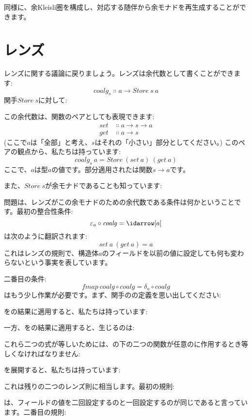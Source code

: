 同様に、余Kleisli圏を構成し、対応する随伴から余モナドを再生成することができます。

\section{レンズ}

レンズに関する議論に戻りましょう。レンズは余代数として書くことができます: 
\[\mathit{coalg}_s \Colon a \to \mathit{Store}\ s\ a\]
関手$\mathit{Store}\ s$に対して: 

この余代数は、関数のペアとしても表現できます: 
\begin{align*}
  \mathit{set} & \Colon a \to s \to a \\
  \mathit{get} & \Colon a \to s
\end{align*}
 (ここで$a$は「全部」と考え、$s$はそれの「小さい」部分としてください。) このペアの観点から、私たちは持っています: 
\[\mathit{coalg}_s\ a = \mathit{Store}\ (\mathit{set}\ a)\ (\mathit{get}\ a)\]
ここで、$a$は型$a$の値です。部分適用されたは関数$s \to a$です。

また、$\mathit{Store}\ s$が余モナドであることも知っています: 

問題は、レンズがこの余モナドのための余代数である条件は何かということです。最初の整合性条件: 
\[\varepsilon_a \circ \mathit{coalg} = \idarrow[a]\]
は次のように翻訳されます: 
\[\mathit{set}\ a\ (\mathit{get}\ a) = a\]
これはレンズの規則で、構造体$a$のフィールドを以前の値に設定しても何も変わらないという事実を表しています。

二番目の条件: 
\[\mathit{fmap}\ \mathit{coalg} \circ \mathit{coalg} = \delta_a \circ \mathit{coalg}\]
はもう少し作業が必要です。まず、関手のの定義を思い出してください: 

をの結果に適用すると、私たちは持っています: 

一方、をの結果に適用すると、生じるのは: 

これら二つの式が等しいためには、の下の二つの関数が任意のに作用するとき等しくなければなりません: 

を展開すると、私たちは持っています: 

これは残りの二つのレンズ則に相当します。最初の規則: 

は、フィールドの値を二回設定するのと一回設定するのが同じであると言っています。二番目の規則: 

